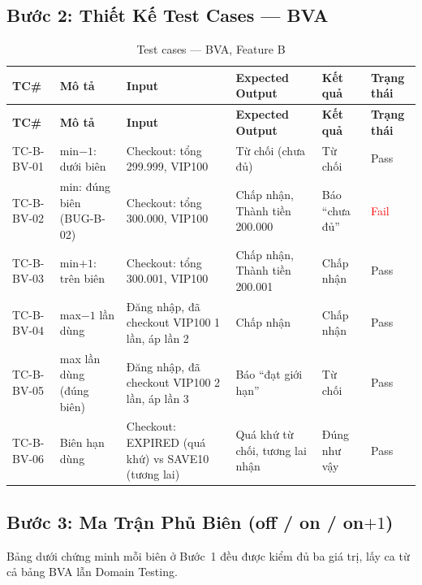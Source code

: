 \documentclass[12pt, a4paper]{report}
\begin{document}
\subsection{Bước 2: Thiết Kế Test Cases — BVA}
\begin{longtable}{C{1.1cm} L{3.2cm} L{3.2cm} L{3cm} C{2cm} C{1.4cm}}
    \caption{Test cases — BVA, Feature B} \\
    \toprule
    \textbf{TC\#} & \textbf{Mô tả} & \textbf{Input} & \textbf{Expected Output} & \textbf{Kết quả} & \textbf{Trạng thái} \\
    \midrule
    \endfirsthead
    \toprule
    \textbf{TC\#} & \textbf{Mô tả} & \textbf{Input} & \textbf{Expected Output} & \textbf{Kết quả} & \textbf{Trạng thái} \\
    \midrule
    \endhead
    \bottomrule
    \endlastfoot
    TC-B-BV-01 & min$-1$: dưới biên & Checkout: tổng 299.999, VIP100 & Từ chối (chưa đủ) & Từ chối & \textcolor{green!60!black}{Pass} \\
    TC-B-BV-02 & min: đúng biên \newline (BUG-B-02) & Checkout: tổng 300.000, VIP100 & Chấp nhận, Thành tiền 200.000 & Báo ``chưa đủ'' & \textcolor{red}{Fail} \\
    TC-B-BV-03 & min$+1$: trên biên & Checkout: tổng 300.001, VIP100 & Chấp nhận, Thành tiền 200.001 & Chấp nhận & \textcolor{green!60!black}{Pass} \\
    TC-B-BV-04 & max$-1$ lần dùng & Đăng nhập, đã checkout VIP100 1 lần, áp lần 2 & Chấp nhận & Chấp nhận & \textcolor{green!60!black}{Pass} \\
    TC-B-BV-05 & max lần dùng (đúng biên) & Đăng nhập, đã checkout VIP100 2 lần, áp lần 3 & Báo ``đạt giới hạn'' & Từ chối & \textcolor{green!60!black}{Pass} \\
    TC-B-BV-06 & Biên hạn dùng & Checkout: EXPIRED (quá khứ) vs SAVE10 (tương lai) & Quá khứ từ chối, tương lai nhận & Đúng như vậy & \textcolor{green!60!black}{Pass} \\
\end{longtable}

\subsection{Bước 3: Ma Trận Phủ Biên (off / on / on$+1$)}
Bảng dưới chứng minh mỗi biên ở Bước~1 đều được kiểm đủ ba giá trị, lấy ca từ cả bảng BVA lẫn
Domain Testing.
\end{document}
